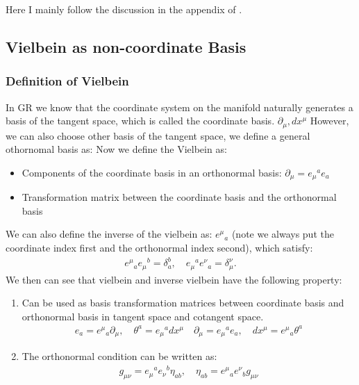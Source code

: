 Here I mainly follow the discussion in the appendix of
\cite{carrollSpacetimeGeometryIntroduction2014}.

\subsection{Vielbein as non-coordinate Basis}
\subsubsection{Definition of Vielbein}
In GR we know that the coordinate system on the manifold naturally
generates a basis of the tangent space, which is called the coordinate basis.
$ \partial_{\mu}, dx^\mu $
However, we can also choose other basis of the tangent space, we
define a general othornomal basis as:
Now we define the Vielbein as:
\begin{itemize}
  \item Components of the coordinate basis in an orthonormal basis: $
    \partial_{\mu} = e_{\mu}{}^a e_a $
  \item Transformation matrix between the coordinate basis and the
    orthonormal basis
\end{itemize}
We can also define the inverse of the vielbein as: $ e^\mu{}_a $ (note
  we always put the coordinate index first and the orthonormal index
second), which satisfy:
\begin{align}
  {e^\mu}_a e_\mu{}^b = \delta_a^b, \quad e_\mu{}^a {e^\nu}_a =
  \delta_\mu^\nu.
\end{align}
We then can see that vielbein and inverse vielbein have the following property:
\begin{enumerate}
  \item    Can be used as basis
    transformation matrices between coordinate basis and orthonormal
    basis in tangent space and cotangent space.
    \begin{align}
      e_a = e^\mu{}_a \partial_{\mu}, \quad \theta^a = e_\mu{}^a
      dx^\mu \quad \partial_{\mu} = e_{\mu}{}^a e_a, \quad dx^\mu =
      e^\mu{}_a \theta^a
    \end{align}
  \item    The orthonormal condition can be written as:
    \begin{align}
      g_{\mu\nu} = e_\mu{}^a e_\nu{}^b \eta_{ab}, \quad \eta_{ab} =
      e^\mu{}_a e^\nu{}_b g_{\mu\nu}
    \end{align}
\end{enumerate}

